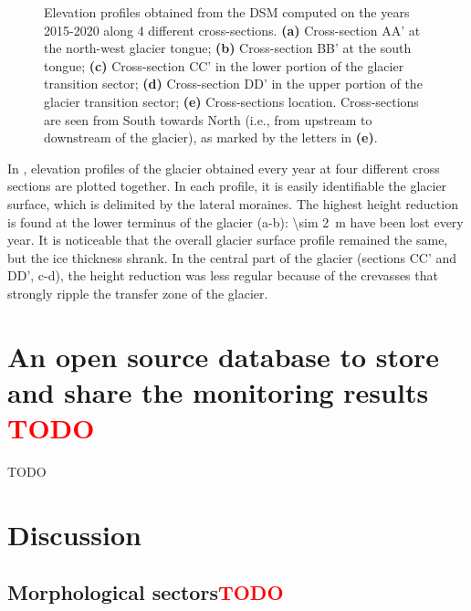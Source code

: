 \begin{figure}
{  }
    \caption{Elevation profiles obtained from the DSM computed on the years 2015-2020 along 4 different cross-sections. \textbf{(a)} Cross-section AA' at the north-west glacier tongue; \textbf{(b)} Cross-section BB' at the south tongue; \textbf{(c)} Cross-section CC' in the lower portion of the glacier transition sector; \textbf{(d)} Cross-section DD' in the upper portion of the glacier transition sector; \textbf{(e)} Cross-sections location. Cross-sections are seen from South towards North (i.e., from upstream to downstream of the glacier), as marked by the letters in \textbf{(e)}.}
    \label{fig:3:profiles}
\end{figure}

In , elevation profiles of the glacier obtained every year at four different cross sections are plotted together.
In each profile, it is easily identifiable the glacier surface, which is delimited by the lateral moraines.
The highest height reduction is found at the lower terminus of the glacier (a-b): \qty{\sim 2}{\meter} have been lost every year. 
It is noticeable that the overall glacier surface profile remained the same, but the ice thickness shrank.
In the central part of the glacier (sections CC' and DD', c-d), the height reduction was less regular because of the crevasses that strongly ripple the transfer zone of the glacier.	



\section{An open source database to store and share the monitoring results \textcolor{red}{TODO}}

{\color{red} TODO}

\section{Discussion}\label{sec:3:discussion}

\subsection{Morphological sectors\textcolor{red}{TODO}}\label{sec:3:discussion:sectors}

